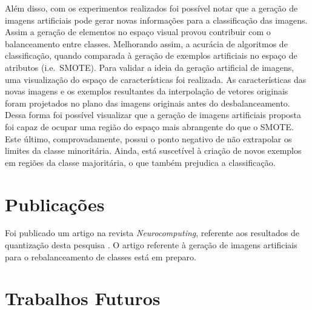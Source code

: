 Além disso, com os experimentos realizados foi possível notar que a geração de imagens artificiais pode gerar novas informações para a classificação das imagens. Assim a geração de elementos no espaço visual provou contribuir com o balanceamento entre classes. Melhorando assim, a acurácia de algoritmos de classificação, quando comparada à geração de exemplos artificiais no espaço de atributos (i.e.\ SMOTE). Para validar a ideia da geração artificial de imagens, uma visualização do espaço de características foi realizada. As características das novas imagens e os exemplos resultantes da interpolação de vetores originais foram projetados no plano das imagens originais antes do desbalanceamento. Dessa forma foi possível visualizar que a geração de imagens artificiais proposta foi capaz de ocupar uma região do espaço mais abrangente do que o SMOTE. Este último, comprovadamente, possui o ponto negativo de não extrapolar os limites da classe minoritária. Ainda, está suscetível à criação de novos exemplos em regiões da classe majoritária, o que também prejudica a classificação.

\section{Publicações}

Foi publicado um artigo na revista \textit{Neurocomputing}, referente aos resultados de quantização desta pesquisa \cite{Ponti2016}. O artigo referente à geração de imagens artificiais para o rebalanceamento de classes está em preparo.


\section{Trabalhos Futuros}


